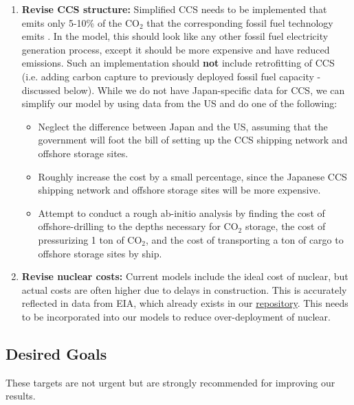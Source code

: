 \documentclass[14pt,a4paper]{article} %
\begin{document}
\begin{enumerate}
\item \textbf{Revise \gls{CCS} structure:} Simplified \gls{CCS} needs to be implemented that emits only 5-10\% of the CO$_2$ that the corresponding fossil fuel technology emits \cite{kato_energy_2016}. In the model, this should look like any other fossil fuel electricity generation process, except it should be more expensive and have reduced emissions. Such an implementation should \textbf{not} include retrofitting of \gls{CCS} (i.e. adding carbon capture to previously deployed fossil fuel capacity - discussed below). While we do not have Japan-specific data for \gls{CCS}, we can simplify our model by using data from the US and do one of the following:
\begin{itemize}

\item Neglect the difference between Japan and the US, assuming that the government will foot the bill of setting up the \gls{CCS} shipping network and offshore storage sites.

\item Roughly increase the cost by a small percentage, since the Japanese \gls{CCS} shipping network and offshore storage sites will be more expensive.

\item Attempt to conduct a rough ab-initio analysis by finding the cost of offshore-drilling to the depths necessary for CO$_2$ storage, the cost of pressurizing 1 ton of CO$_2$, and the cost of transporting a ton of cargo to offshore storage sites by ship.

\end{itemize}

\item \textbf{Revise nuclear costs:} Current models include the ideal cost of nuclear, but actual costs are often higher due to delays in construction. This is accurately reflected in data from \gls{EIA}, which already exists in our \href{https://github.com/arfc/i2cner/tree/master/data/japan_costs/fossil-ccs-nuc.xlsx}{repository}. This needs to be incorporated into our models to reduce over-deployment of nuclear.

\end{enumerate}

\subsection{Desired Goals}
These targets are not urgent but are strongly recommended for improving our results.
\end{document}
